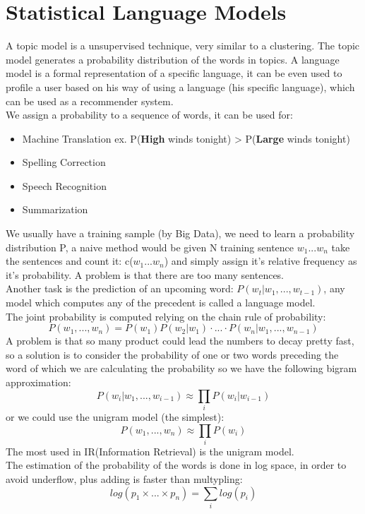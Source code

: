 \documentclass[11pt, a4page]{article}
\begin{document}
\section{Statistical Language Models}
A topic model is a unsupervised technique, very similar to a clustering. The topic model generates a probability distribution of the words in topics. 
A language model is a formal representation of a specific language, it can be even used to profile a user based on his way of using a language (his specific language), which can be used as a recommender system.\\
We assign a probability to a sequence of words, it can be used for:
\begin{itemize}[noitemsep]
	\item Machine Translation
	ex. P(\textbf{High} winds tonight) > P(\textbf{Large} winds tonight) 
	\item Spelling Correction
	\item Speech Recognition
	\item Summarization
\end{itemize}
We usually have a training sample (by Big Data), we need to learn a probability distribution P, a naive method would be given N training sentence $w_1 ... w_n$ take the sentences and count it: c($w_1 ... w_n$) and simply assign it's relative frequency as it's probability. A problem is that there are too many sentences.\\
Another task is the prediction of an upcoming word: $P(w_t|w_1,..., w_{t-1})$, any model which computes any of the precedent is called a language model.\\
The joint probability is computed relying on the chain rule of probability:
$$ P(w_1,...,w_n) =P(w_1)P(w_2|w_1)\cdot ...\cdot P(w_n|w_1,...,w_{n-1}) $$
A problem is that so many product could lead the numbers to decay pretty fast, so a solution is to consider the probability of one or two words preceding the word of which we are calculating the probability so we have the following bigram approximation:
$$ P(w_i|w_1,...,w_{i-1}) \approx \prod_i P(w_i|w_{i-1}) $$
or we could use the unigram model (the simplest):
$$ P(w_1,...,w_n) \approx \prod_i P(w_i) $$
The most used in IR(Information Retrieval) is the unigram model.
\\
The estimation of the probability of the words is done in log space, in order to avoid underflow, plus adding is faster than multypling:
$$log(p_1 \times ... \times p_n) = \sum_i log(p_i)$$
\end{document}
